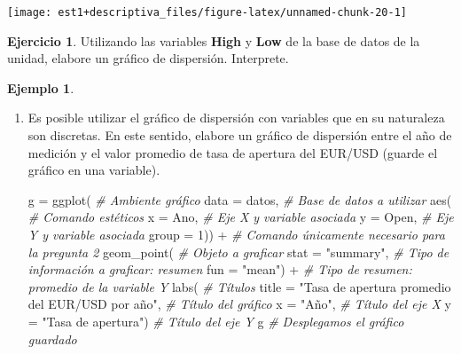 \documentclass[
]{book}
\newenvironment{Shaded}{\begin{snugshade}}{\end{snugshade}}
\newcommand{\AttributeTok}[1]{\textcolor[rgb]{0.77,0.63,0.00}{#1}}
\newcommand{\CommentTok}[1]{\textcolor[rgb]{0.56,0.35,0.01}{\textit{#1}}}
\newcommand{\DecValTok}[1]{\textcolor[rgb]{0.00,0.00,0.81}{#1}}
\newcommand{\FunctionTok}[1]{\textcolor[rgb]{0.00,0.00,0.00}{#1}}
\newcommand{\NormalTok}[1]{#1}
\newcommand{\OtherTok}[1]{\textcolor[rgb]{0.56,0.35,0.01}{#1}}
\newcommand{\SpecialCharTok}[1]{\textcolor[rgb]{0.00,0.00,0.00}{#1}}
\newcommand{\StringTok}[1]{\textcolor[rgb]{0.31,0.60,0.02}{#1}}
\theoremstyle{definition}
\theoremstyle{definition}
\newtheorem{example}{Ejemplo}[chapter]
\theoremstyle{definition}
\newtheorem{exercise}{Ejercicio}[chapter]
\theoremstyle{definition}
\theoremstyle{remark}
\begin{document}
\begin{center}\texttt{[image: est1+descriptiva\_files/figure-latex/unnamed-chunk-20-1]} \end{center}

\begin{exercise}
Utilizando las variables \textbf{High} y \textbf{Low} de la base de datos de la unidad, elabore un gráfico de dispersión. Interprete.
\end{exercise}

\begin{example}
\leavevmode

\begin{enumerate}
\def\labelenumi{\arabic{enumi}.}
\item
  Es posible utilizar el gráfico de dispersión con variables que en su naturaleza son discretas. En este sentido, elabore un gráfico de dispersión entre el año de medición y el valor promedio de tasa de apertura del EUR/USD (guarde el gráfico en una variable).

\begin{Shaded}
\begin{Highlighting}[]
\NormalTok{g }\OtherTok{=} \FunctionTok{ggplot}\NormalTok{( }\CommentTok{\# Ambiente gráfico}
  \AttributeTok{data =}\NormalTok{ datos, }\CommentTok{\# Base de datos a utilizar}
  \FunctionTok{aes}\NormalTok{( }\CommentTok{\# Comando estéticos}
\AttributeTok{x =}\NormalTok{ Ano, }\CommentTok{\# Eje X y variable asociada}
\AttributeTok{y =}\NormalTok{ Open, }\CommentTok{\# Eje Y y variable asociada}
\AttributeTok{group =} \DecValTok{1}\NormalTok{)) }\SpecialCharTok{+} \CommentTok{\# Comando únicamente necesario para la pregunta 2}
  \FunctionTok{geom\_point}\NormalTok{( }\CommentTok{\# Objeto a graficar}
\AttributeTok{stat =} \StringTok{"summary"}\NormalTok{, }\CommentTok{\# Tipo de información a graficar: resumen}
\AttributeTok{fun =} \StringTok{"mean"}\NormalTok{) }\SpecialCharTok{+} \CommentTok{\# Tipo de resumen: promedio de la variable Y}
  \FunctionTok{labs}\NormalTok{( }\CommentTok{\# Títulos}
\AttributeTok{title =} \StringTok{"Tasa de apertura promedio del EUR/USD por año"}\NormalTok{, }\CommentTok{\# Título del gráfico}
\AttributeTok{x =} \StringTok{"Año"}\NormalTok{, }\CommentTok{\# Título del eje X}
\AttributeTok{y =} \StringTok{"Tasa de apertura"}\NormalTok{) }\CommentTok{\# Título del eje Y}
\NormalTok{g }\CommentTok{\# Desplegamos el gráfico guardado}
\end{Highlighting}
\end{Shaded}


\end{enumerate}
\end{example}
\end{document}
